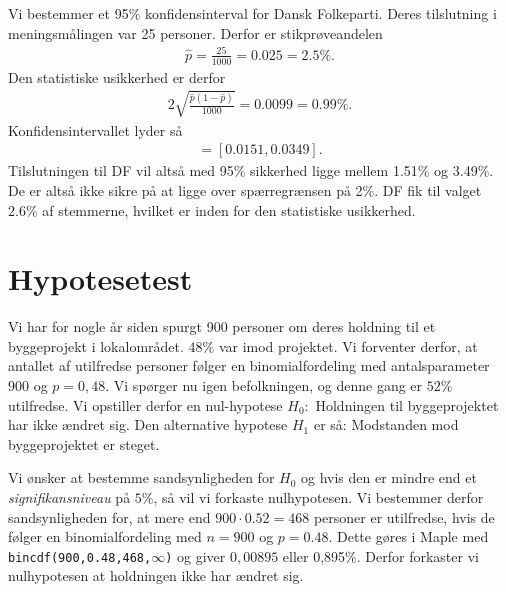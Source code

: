 \begin{exa}
	Vi bestemmer et 95$\%$ konfidensinterval for Dansk Folkeparti. Deres tilslutning i meningsmålingen var 25 personer. Derfor er stikprøveandelen
	\begin{align*}
		\hat{p} = \frac{25}{1000} = 0.025 = 2.5\%.
	\end{align*}
	Den statistiske usikkerhed er derfor
	\begin{align*}
		2\sqrt{\frac{\hat{p}(1-\hat{p})}{1000}} = 0.0099 = 0.99\%.
	\end{align*}
	Konfidensintervallet lyder så
	\begin{align*}
		[0.025-0.0099,0.025+0.0099] = [0.0151,0.0349].
	\end{align*}
	Tilslutningen til DF vil altså med 95$\%$ sikkerhed ligge mellem 1.51$\%$ og 3.49$\%$. De er altså ikke sikre på at ligge over spærregrænsen på 2$\%$. DF fik til valget $2.6\%$ af stemmerne, hvilket
	er inden for den statistiske usikkerhed.
\end{exa}

\section*{Hypotesetest}
Vi har for nogle år siden spurgt 900 personer om deres holdning til et byggeprojekt i lokalområdet. 48$\%$ var imod projektet. Vi forventer derfor, at antallet af utilfredse personer følger en binomialfordeling med antalsparameter $900$ og $p = 0,48$. Vi spørger nu igen befolkningen, og denne gang er $52\%$ utilfredse. Vi opstiller derfor en nul-hypotese $H_0:$ Holdningen til byggeprojektet har ikke ændret sig. Den alternative hypotese $H_1$ er så: Modstanden mod byggeprojektet er steget. 

Vi ønsker at bestemme sandsynligheden for $H_0$ og hvis den er mindre end et \textit{signifikansniveau} på $5\%$, så vil vi forkaste nulhypotesen. 
Vi bestemmer derfor sandsynligheden for, at mere end $900\cdot 0.52 = 468$ personer er utilfredse, hvis de følger en binomialfordeling med $n=900$ og $p = 0.48$. Dette gøres i Maple med \texttt{bincdf(900,0.48,468,$\infty$)} og giver 
$0,00895$ eller 0,895$\%$. Derfor forkaster vi nulhypotesen at holdningen ikke har ændret sig. 

